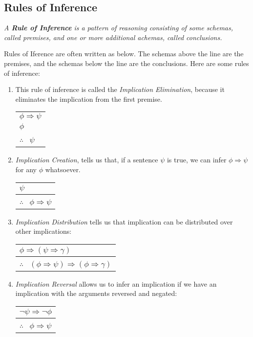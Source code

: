 \documentclass[10pt,a4pape,twocolumn]{article}
\newenvironment{infrule}
    {\begin{center}\begin{tabular}{l}}{\end{tabular}\end{center}}
\newcommand{\conc}{\hline$\therefore \ \ $}
\begin{document}
            \subsection{Rules of Inference}
                \begin{define}
                    \textit{A \textbf{Rule of Inference} is a pattern of reasoning consisting of some schemas, called premises, and one or more additional achemas, called conclusions.}
                \end{define}
                Rules of Iference are often written as below. The schemas above the line are the premises, and the schemas below the line are the conclusions. Here are some rules of inference:
                \begin{enumerate}
                    \item This rule of inference is called the \textit{Implication Elimination}, because it eliminates the implication from the first premise.
                    \begin{infrule}
                        $\phi \Rightarrow \psi$ \\
                        $\phi$\\
                        \conc 
                        $\psi$
                    \end{infrule}
                    \item \textit{Implication Creation}, tells us that, if a sentence $\psi$ is true, we can infer $\phi\Rightarrow\psi$ for any $\phi$ whatsoever.
                    \begin{infrule}
                        $\psi$\\ 
                        \conc 
                        $\phi\Rightarrow\psi$
                    \end{infrule}
                    \item \textit{Implication Distribution} tells us that implication can be distributed over other implications:
                        \begin{infrule}
                            $\phi\Rightarrow(\psi\Rightarrow\gamma)$\\
                            \conc
                            $(\phi\Rightarrow\psi)\Rightarrow(\phi\Rightarrow\gamma)$
                        \end{infrule}
                    \item \textit{Implication Reversal} allows us to infer an implication if we have an implication with the arguments reversed and negated:
                        \begin{infrule}
                            $\neg \psi \Rightarrow \neg \phi$\\
                            \conc 
                            $\phi \Rightarrow \psi$
                        \end{infrule}
                \end{enumerate} 
\end{document}
